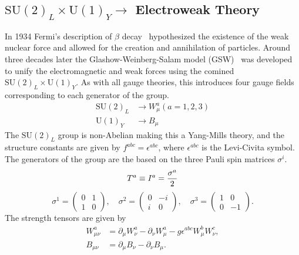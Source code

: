 \subsection{\texorpdfstring{$\text{SU}(2)_L \times \text{U}(1)_Y \rightarrow$}{SU(2)xSU(1)-} Electroweak Theory}
\label{sec:electroweak}

In 1934 Fermi's description of $\beta$ decay~\cite{Fermi1934} hypothesized the existence of the weak nuclear force and allowed for the creation and annihilation of particles.
Around three decades later the Glashow-Weinberg-Salam model (GSW)~\cite{Glashow1961, Weinberg1967,Salam1964} was developed to unify the electromagnetic and weak forces using the comined $\text{SU}(2)_L \times \text{U}(1)_Y$.
As with all gauge theories, this introduces four gauge fields corresponding to each generator of the group.
\begin{align}
	\text{SU}(2)_L & \rightarrow W_\mu^a(a = 1, 2, 3) \\
	\text{U}(1)_Y  & \rightarrow B_\mu
\end{align}
The $\text{SU}(2)_L$ group is non-Abelian making this a Yang-Mills theory, and the structure constants are given by $f^{abc} = \epsilon^{abc}$, where $\epsilon^{abc}$ is the Levi-Civita symbol.
The generators of the group are the based on the three Pauli spin matrices $\sigma^i$.
\begin{equation}
	\label{eq:su2_generators}
	T^a \equiv I^a = \frac{\sigma^a}{2} \\
\end{equation}
\begin{equation}
	\sigma^1 = \begin{pmatrix} 0 & 1 \\ 1 & 0 \end{pmatrix},
	\quad \sigma^2 = \begin{pmatrix} 0 & -i \\ i & 0 \end{pmatrix},
	\quad \sigma^3 = \begin{pmatrix} 1 & 0 \\ 0 & -1 \end{pmatrix}.
	\label{eq:pauli_matrices}
\end{equation}
The strength tensors are given by
\begin{align}
	\label{eq:ew_field_strength_tensors}
	W_{\mu\nu}^a & = \partial_\mu W_\nu^a - \partial_\nu W_\mu^a - g \epsilon^{abc} W_\mu^b W_\nu^c, \\
	B_{\mu\nu}   & = \partial_\mu B_\nu - \partial_\nu B_\mu.
\end{align}
